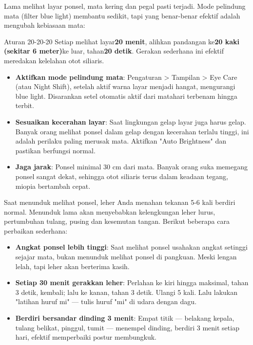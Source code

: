 Lama melihat layar ponsel, mata kering dan pegal pasti terjadi. Mode pelindung mata (filter blue light) membantu sedikit, tapi yang benar-benar efektif adalah mengubah kebiasaan mata:

\begin{tcbinfo}{Aturan 20-20-20}
Setiap melihat layar\textbf{20 menit}, alihkan pandangan ke\textbf{20 kaki (sekitar 6 meter)}ke luar, tahan\textbf{20 detik}. Gerakan sederhana ini efektif meredakan kelelahan otot siliaris.

\end{tcbinfo}

\begin{itemize}
  \item \textbf{Aktifkan mode pelindung mata}: Pengaturan > Tampilan > Eye Care (atau Night Shift), setelah aktif warna layar menjadi hangat, mengurangi blue light. Disarankan setel otomatis aktif dari matahari terbenam hingga terbit.
  \item \textbf{Sesuaikan kecerahan layar}: Saat lingkungan gelap layar juga harus gelap. Banyak orang melihat ponsel dalam gelap dengan kecerahan terlalu tinggi, ini adalah perilaku paling merusak mata. Aktifkan "Auto Brightness" dan pastikan berfungsi normal.
  \item \textbf{Jaga jarak}: Ponsel minimal 30 cm dari mata. Banyak orang suka memegang ponsel sangat dekat, sehingga otot siliaris terus dalam keadaan tegang, miopia bertambah cepat.
\end{itemize}


Saat menunduk melihat ponsel, leher Anda menahan tekanan 5-6 kali berdiri normal. Menunduk lama akan menyebabkan kelengkungan leher lurus, pertumbuhan tulang, pusing dan kesemutan tangan. Berikut beberapa cara perbaikan sederhana:

\begin{itemize}
  \item \textbf{Angkat ponsel lebih tinggi}: Saat melihat ponsel usahakan angkat setinggi sejajar mata, bukan menunduk melihat ponsel di pangkuan. Meski lengan lelah, tapi leher akan berterima kasih.
  \item \textbf{Setiap 30 menit gerakkan leher}: Perlahan ke kiri hingga maksimal, tahan 3 detik, kembali; lalu ke kanan, tahan 3 detik. Ulangi 5 kali. Lalu lakukan "latihan huruf mi" — tulis huruf "mi" di udara dengan dagu.
  \item \textbf{Berdiri bersandar dinding 3 menit}: Empat titik — belakang kepala, tulang belikat, pinggul, tumit — menempel dinding, berdiri 3 menit setiap hari, efektif memperbaiki postur membungkuk.
\end{itemize}

